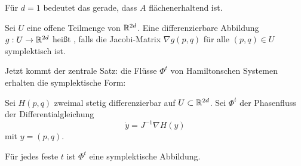 \begin{bem}
	Für $d=1$ bedeutet das gerade, dass $A$ flächenerhaltend ist.
\end{bem}

\begin{definition}
	Sei $U$ eine offene Teilmenge von $\mathbb R^{2d}$.
	Eine differenzierbare Abbildung $g: U \to \mathbb R^{2d}$ heißt , falls die Jacobi-Matrix $\nabla g(p,q)$ für alle $(p, q) \in U$ symplektisch ist.
\end{definition}

Jetzt kommt der zentrale Satz: die Flüsse $\Phi^t$ von Hamiltonschen Systemen erhalten die symplektische Form:

\begin{satz}[Poincaré, 1899]
	Sei $H(p, q)$ zweimal stetig differenzierbar auf $U \subset \mathbb R^{2d}$.
	Sei $\Phi^t$ der Phasenfluss der Differentialgleichung
	\begin{equation*}
		\dot y = J^{-1} \nabla H(y)
	\end{equation*}
	mit $y = (p, q)$.

	Für jedes feste $t$ ist $\Phi^t$ eine symplektische Abbildung.
\end{satz}

